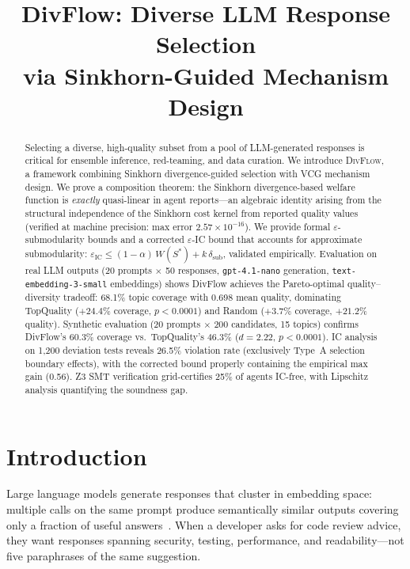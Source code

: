 \documentclass[10pt]{article}
\title{\textbf{DivFlow: Diverse LLM Response Selection\\via Sinkhorn-Guided Mechanism Design}}
\date{}
\begin{document}
\maketitle

\begin{abstract}
Selecting a diverse, high-quality subset from a pool of LLM-generated responses is critical for ensemble inference, red-teaming, and data curation.
We introduce \textsc{DivFlow}, a framework combining Sinkhorn divergence-guided selection with VCG mechanism design.
We prove a composition theorem: the Sinkhorn divergence-based welfare function is \emph{exactly} quasi-linear in agent reports---an algebraic identity arising from the structural independence of the Sinkhorn cost kernel from reported quality values (verified at machine precision: max error $2.57 \times 10^{-16}$).
We provide formal $\varepsilon$-submodularity bounds and a corrected $\varepsilon$-IC bound that accounts for approximate submodularity: $\varepsilon_{\mathrm{IC}} \leq (1-\alpha)\,W(S^*) + k\,\delta_{\mathrm{sub}}$, validated empirically.
Evaluation on real LLM outputs (20 prompts $\times$ 50 responses, \texttt{gpt-4.1-nano} generation, \texttt{text-embedding-3-small} embeddings) shows DivFlow achieves the Pareto-optimal quality--diversity tradeoff: 68.1\% topic coverage with 0.698 mean quality, dominating TopQuality ($+24.4\%$ coverage, $p < 0.0001$) and Random ($+3.7\%$ coverage, $+21.2\%$ quality).
Synthetic evaluation (20 prompts $\times$ 200 candidates, 15 topics) confirms DivFlow's 60.3\% coverage vs.\ TopQuality's 46.3\% ($d=2.22$, $p < 0.0001$).
IC analysis on 1{,}200 deviation tests reveals 26.5\% violation rate (exclusively Type~A selection boundary effects), with the corrected bound properly containing the empirical max gain (0.56).
Z3 SMT verification grid-certifies 25\% of agents IC-free, with Lipschitz analysis quantifying the soundness gap.
\end{abstract}

\section{Introduction}
\label{sec:intro}

Large language models generate responses that cluster in embedding space: multiple calls on the same prompt produce semantically similar outputs covering only a fraction of useful answers~\citep{wang2023selfconsistency, li2023diverse}.
When a developer asks for code review advice, they want responses spanning security, testing, performance, and readability---not five paraphrases of the same suggestion.
\end{document}
